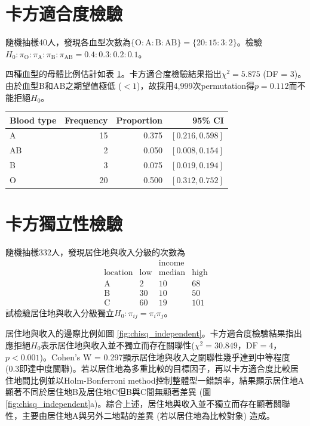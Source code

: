\documentclass[12pt]{article}
\begin{document}
\section{卡方適合度檢驗}
隨機抽樣40人，發現各血型次數為$\{\text{O} : \text{A} : \text{B} : \text{AB}\} = \{20:15:3:2\}$。檢驗$H_0: \pi_{\mathrm{O}} : \pi_{\mathrm{A}} : \pi_{\mathrm{B}} : \pi_{\mathrm{AB}} = 0.4:0.3:0.2:0.1$。

四種血型的母體比例估計如表 \ref{table:chisq_goodness}。卡方適合度檢驗結果指出$\chi^2 = 5.875$ (DF = 3)。由於血型B和AB之期望值極低 ($<1$)，故採用4,999次permutation得$p = 0.112$而不能拒絕$H_0$。

\begin{table}[htb!]
	\centering
	\begin{tabular}{lrrr}
		\hline
		Blood type & Frequency & Proportion & 95\% CI \\ 
		\hline
		A & 15 & 0.375 & $\left[0.216, 0.598\right]$ \\ 
		AB & 2 & 0.050 & $\left[0.008, 0.154\right]$ \\ 
		B & 3 & 0.075 & $\left[0.019, 0.194\right]$ \\ 
		O & 20 & 0.500 & $\left[0.312, 0.752\right]$ \\ 
		\hline
	\end{tabular}
	\label{table:chisq_goodness}
\end{table}


\section{卡方獨立性檢驗}
隨機抽樣332人，發現居住地與收入分級的次數為
\[
	\begin{matrix}
		                & &\text{income} &  \\
		\text{location} & \text{low} & \text{median} & \text{high}\\
		\text{A} & 2 & 10 & 68 \\
		\text{B} & 30 & 10 & 50 \\
		\text{C} & 60 & 19 & 101
	\end{matrix}
\]
試檢驗居住地與收入分級獨立$H_0: \pi_{ij} = \pi_i\pi_j$。

居住地與收入的邊際比例如圖 \ref{fig:chisq_independent}。卡方適合度檢驗結果指出應拒絕$H_0$表示居住地與收入並不獨立而存在關聯性($\chi^2 = 30.849$，$\text{DF} = 4$，$p < 0.001$)。Cohen's W = 0.297顯示居住地與收入之關聯性幾乎達到中等程度 (0.3即達中度關聯)。若以居住地為多重比較的目標因子，再以卡方適合度比較居住地間比例並以Holm-Bonferroni method控制整體型一錯誤率，結果顯示居住地A顯著不同於居住地B及居住地C但B與C間無顯著差異 (圖 \ref{fig:chisq_independent}a)。綜合上述，居住地與收入並不獨立而存在顯著關聯性，主要由居住地A與另外二地點的差異 (若以居住地為比較對象) 造成。
\end{document}
